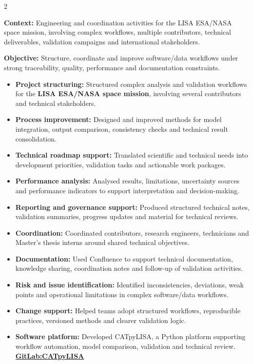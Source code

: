 \documentclass[8pt,a4paper,ragged2e,withhyper]{altacv}
\begin{document}
\begin{paracol}{2}
\divider


\textbf{Context:} Engineering and coordination activities for the LISA ESA/NASA space mission, involving complex workflows, multiple contributors, technical deliverables, validation campaigns and international stakeholders.

\textbf{Objective:} Structure, coordinate and improve software/data workflows under strong traceability, quality, performance and documentation constraints.

\begin{itemize}
  \item \textbf{Project structuring:} Structured complex analysis and validation workflows for the \textbf{LISA ESA/NASA space mission}, involving several contributors and technical stakeholders.
  \item \textbf{Process improvement:} Designed and improved methods for model integration, output comparison, consistency checks and technical result consolidation.
  \item \textbf{Technical roadmap support:} Translated scientific and technical needs into development priorities, validation tasks and actionable work packages.
  \item \textbf{Performance analysis:} Analysed results, limitations, uncertainty sources and performance indicators to support interpretation and decision-making.
  \item \textbf{Reporting and governance support:} Produced structured technical notes, validation summaries, progress updates and material for technical reviews.
  \item \textbf{Coordination:} Coordinated contributors, research engineers, technicians and Master's thesis interns around shared technical objectives.
  \item \textbf{Documentation:} Used Confluence to support technical documentation, knowledge sharing, coordination notes and follow-up of validation activities.
  \item \textbf{Risk and issue identification:} Identified inconsistencies, deviations, weak points and operational limitations in complex software/data workflows.
  \item \textbf{Change support:} Helped teams adopt structured workflows, reproducible practices, versioned methods and clearer validation logic.
  \item \textbf{Software platform:} Developed CATpyLISA, a Python platform supporting workflow automation, model comparison, validation and technical review.
  \textcolor{DarkPastelRed}{\href{https://gitlab.oca.eu/gboileau/lisa_l3_tools}{\bf GitLab:CATpyLISA}}
\end{itemize}


\end{paracol}
\end{document}
